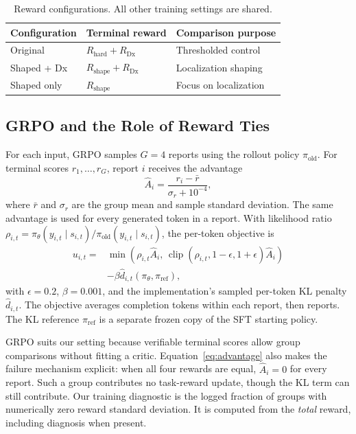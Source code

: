 \documentclass[conference]{IEEEtran}
\begin{document}
\begin{table}[t]
\centering
\caption{Reward configurations. All other training settings are shared.}
\label{tab:design}
\small
\begin{tabular}{@{}lll@{}}
\toprule
Configuration & Terminal reward & Comparison purpose\\
\midrule
Original & $R_{\mathrm{hard}}+R_{\mathrm{Dx}}$ & Thresholded control\\
Shaped + Dx & $R_{\mathrm{shape}}+R_{\mathrm{Dx}}$ & Localization shaping\\
Shaped only & $R_{\mathrm{shape}}$ & Focus on localization\\
\bottomrule
\end{tabular}
\end{table}

\subsection{GRPO and the Role of Reward Ties}
For each input, GRPO samples $G=4$ reports using the rollout policy $\pi_{\mathrm{old}}$. For terminal scores $r_1,\ldots,r_G$, report $i$ receives the advantage
\begin{equation}
 \hat A_i=\frac{r_i-\bar r}{\sigma_r+10^{-4}},
 \label{eq:advantage}
\end{equation}
where $\bar r$ and $\sigma_r$ are the group mean and sample standard deviation. The same advantage is used for every generated token in a report. With likelihood ratio $\rho_{i,t}=\pi_\theta(y_{i,t}\mid s_{i,t})/\pi_{\mathrm{old}}(y_{i,t}\mid s_{i,t})$, the per-token objective is
\begin{align}
 u_{i,t}={}&\min\!\left(\rho_{i,t}\hat A_i,\,
 \operatorname{clip}(\rho_{i,t},1-\epsilon,1+\epsilon)\hat A_i\right)
 \nonumber\\
 &-\beta\hat d_{i,t}(\pi_\theta,\pi_{\mathrm{ref}}),
\end{align}
with $\epsilon=0.2$, $\beta=0.001$, and the implementation's sampled per-token KL penalty $\hat d_{i,t}$. The objective averages completion tokens within each report, then reports. The KL reference $\pi_{\mathrm{ref}}$ is a separate frozen copy of the SFT starting policy.

GRPO suits our setting because verifiable terminal scores allow group comparisons without fitting a critic. Equation~\eqref{eq:advantage} also makes the failure mechanism explicit: when all four rewards are equal, $\hat A_i=0$ for every report. Such a group contributes no task-reward update, though the KL term can still contribute. Our training diagnostic is the logged fraction of groups with numerically zero reward standard deviation. It is computed from the \emph{total} reward, including diagnosis when present.
\end{document}
